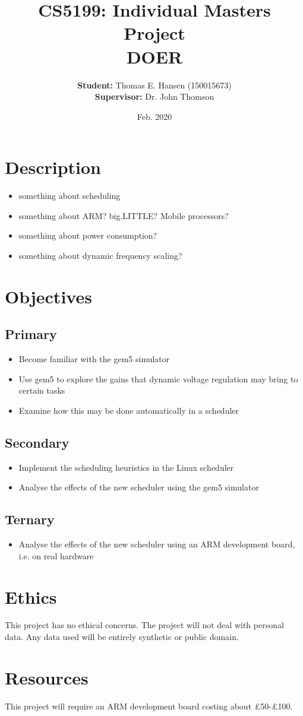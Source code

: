 \documentclass{article}
\title{CS5199: Individual Masters Project\\DOER}
\author{\textbf{Student:} Thomas E. Hansen (150015673)\\\textbf{Supervisor:}
    Dr. John Thomson}
\date{Feb. 2020}
\begin{document}
    
    \maketitle
    
    \section{Description}
    \begin{itemize}
        \item something about scheduling
        \item something about ARM? big.LITTLE? Mobile processors?
        \item something about power consumption?
        \item something about dynamic frequency scaling?
    \end{itemize}
    
    \section{Objectives}
        \subsection{Primary}
        \begin{itemize}
            \item Become familiar with the gem5 simulator
            \item Use gem5 to explore the gains that dynamic voltage regulation
                  may bring to certain tasks
            \item Examine how this may be done automatically in a scheduler
        \end{itemize}
        
        \subsection{Secondary}
        \begin{itemize}
            \item Implement the scheduling heuristics in the Linux scheduler
            \item Analyse the effects of the new scheduler using the gem5
                  simulator
        \end{itemize}
        
        \subsection{Ternary}
        \begin{itemize}
            \item Analyse the effects of the new scheduler using an ARM
                  development board, i.e. on real hardware
        \end{itemize}
        
    \section{Ethics}
    This project has no ethical concerns. The project will not deal with
    personal data. Any data used will be entirely synthetic or public domain.
    
    \section{Resources}
    This project will require an ARM development board costing about £50-£100.
\end{document}
